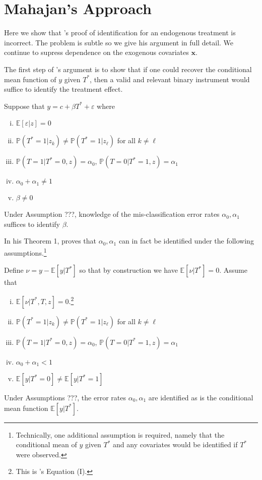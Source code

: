 \section{Mahajan's Approach}
Here we show that \citeauthor{Mahajan}'s proof of identification for an endogenous treatment is incorrect.
The problem is subtle so we give his argument in full detail.
We continue to supress dependence on the exogenous covariates $\mathbf{x}$.

The first step of \citeauthor{Mahajan}'s argument is to show that if one could recover the conditional mean function of $y$ given $T^*$, then a valid and relevant binary instrument would suffice to identify the treatment effect.  
\begin{assump}[Mahajan A2]\mbox{}
  Suppose that $y = c+ \beta T^* + \varepsilon$ where
  \begin{enumerate}[(i)]
    \item $\mathbb{E}[\varepsilon|z]=0$
    \item $\mathbb{P}(T^*=1|z_k)\neq \mathbb{P}(T^*=1|z_\ell)$ for all $k\neq \ell$
    \item $\mathbb{P}(T = 1| T^* = 0, z) = \alpha_0$, $\mathbb{P}(T = 0| T^* = 1, z) = \alpha_1$
    \item $\alpha_0 + \alpha_1 \neq 1$
    \item $\beta \neq 0$
  \end{enumerate}
\end{assump}

\begin{lem}[Mahajan A2]
Under Assumption ???, knowledge of the mis-classification error rates $\alpha_0, \alpha_1$ suffices to identify $\beta$.
\end{lem}

In his Theorem 1, \cite{Mahajan} proves that $\alpha_0, \alpha_1$ can in fact be identified under the following assumptions.\footnote{Technically, one additional assumption is required, namely that the conditional mean of $y$ given $T^*$ and any covariates would be identified if $T^*$ were observed.}
\begin{assump}[Mahajan A1] Define $\nu = y - \mathbb{E}[y|T^*]$ so that by construction we have $\mathbb{E}[\nu|T^*]=0$. Assume that
  \begin{enumerate}[(i)]
    \item $\mathbb{E}[\nu|T^*,T,z] = 0$.\footnote{This is \citeauthor{Mahajan}'s Equation (I).}
    \item $\mathbb{P}(T^*=1|z_k)\neq \mathbb{P}(T^*=1|z_\ell)$ for all $k\neq \ell$
    \item $\mathbb{P}(T = 1| T^* = 0, z) = \alpha_0$,  $\mathbb{P}(T = 0| T^* = 1, z) = \alpha_1$
    \item $\alpha_0 + \alpha_1 < 1$
    \item $\mathbb{E}[y|T^*=0]\neq \mathbb{E}[y|T^*=1]$
  \end{enumerate}
\end{assump}
\begin{lem}
  Under Assumptions ???, the error rates $\alpha_0, \alpha_1$ are identified as is the conditional mean function $\mathbb{E}[y|T^*]$.
\end{lem}

